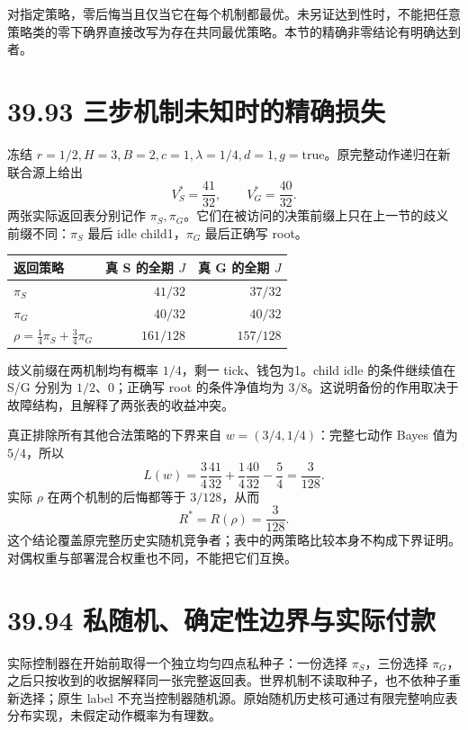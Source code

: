 \documentclass[
  11pt,
  oneside]{book}
\newcounter{none} %
\begin{document}
对指定策略，零后悔当且仅当它在每个机制都最优。未另证达到性时，不能把任意策略类的零下确界直接改写为存在共同最优策略。本节的精确非零结论有明确达到者。

\section{39.93 三步机制未知时的精确损失}\label{ux4e09ux6b65ux673aux5236ux672aux77e5ux65f6ux7684ux7cbeux786eux635fux5931}

冻结 \(r=1/2,H=3,B=2,c=1,\lambda=1/4,d=1,g=\mathrm{true}\)。原完整动作递归在新联合源上给出 \[V_S^*=\frac{41}{32},\qquad V_G^*=\frac{40}{32}.\] 两张实际返回表分别记作 \(\pi_S,\pi_G\)。它们在被访问的决策前缀上只在上一节的歧义前缀不同：\(\pi_S\) 最后 idle child1，\(\pi_G\) 最后正确写 root。

{\def\LTcaptype{none} %
\begin{longtable}[]{@{}lrr@{}}
\toprule\noalign{}
返回策略 & 真 S 的全期 \(J\) & 真 G 的全期 \(J\) \\
\midrule\noalign{}
\endhead
\bottomrule\noalign{}
\endlastfoot
\(\pi_S\) & \(41/32\) & \(37/32\) \\
\(\pi_G\) & \(40/32\) & \(40/32\) \\
\(\rho=\tfrac14\pi_S+\tfrac34\pi_G\) & \(161/128\) & \(157/128\) \\
\end{longtable}
}

歧义前缀在两机制均有概率 \(1/4\)，剩一 tick、钱包为1。child idle 的条件继续值在 S/G 分别为 \(1/2\)、0；正确写 root 的条件净值均为 \(3/8\)。这说明备份的作用取决于故障结构，且解释了两张表的收益冲突。

真正排除所有其他合法策略的下界来自 \(w=(3/4,1/4)\)：完整七动作 Bayes 值为 \(5/4\)，所以 \[L(w)=\frac34\frac{41}{32}+\frac14\frac{40}{32}-\frac54=\frac3{128}.\] 实际 \(\rho\) 在两个机制的后悔都等于 \(3/128\)，从而 \[R^*=R(\rho)=\frac3{128}.\] 这个结论覆盖原完整历史实随机竞争者；表中的两策略比较本身不构成下界证明。对偶权重与部署混合权重也不同，不能把它们互换。

\section{39.94 私随机、确定性边界与实际付款}\label{ux79c1ux968fux673aux786eux5b9aux6027ux8fb9ux754cux4e0eux5b9eux9645ux4ed8ux6b3e}

实际控制器在开始前取得一个独立均匀四点私种子：一份选择 \(\pi_S\)，三份选择 \(\pi_G\)，之后只按收到的收据解释同一张完整返回表。世界机制不读取种子，也不依种子重新选择；原生 label 不充当控制器随机源。原始随机历史核可通过有限完整响应表分布实现，未假定动作概率为有理数。
\end{document}
